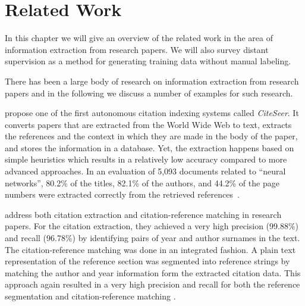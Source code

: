 \chapter{Related Work}\label{cha:related-work}
In this chapter we will give an overview of the related work in the area of information extraction from research papers.
We will also survey \gls{distant supervision} as a method for generating training data without manual labeling.

\bigskip

There has been a large body of research on information extraction from research papers and in the following we discuss a number of examples for such research.

\citet{giles1998citeseer} propose one of the first autonomous citation indexing systems called \emph{CiteSeer}.
It converts papers that are extracted from the World Wide Web to text, extracts the references and the context in which they are made in the body of the paper, and stores the information in a database.
Yet, the extraction happens based on simple heuristics which results in a relatively low accuracy compared to more advanced approaches.
In an evaluation of 5,093 documents related to ``neural networks'', 80.2\% of the titles, 82.1\% of the authors, and 44.2\% of the page numbers were extracted correctly from the retrieved references~\cite{giles1998citeseer}.


\citet{powley2007evidence} address both citation extraction and citation-reference matching in research papers.
For the citation extraction, they achieved a very high precision (99.88\%) and recall (96.78\%) by identifying pairs of year and author surnames in the text.
The citation-reference matching was done in an integrated fashion.
A plain text representation of the reference section was segmented into reference strings by matching the author and year information form the extracted citation data.
This approach again resulted in a very high precision and recall for both the reference segmentation and citation-reference matching \citep{powley2007evidence}.


